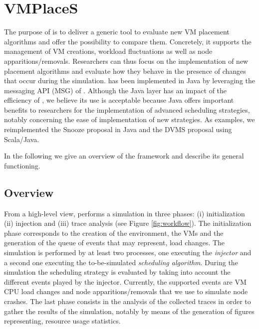 \section{VMPlaceS}
\label{sec:injector}

The purpose of \vmps is to deliver a generic tool to evaluate new VM
placement algorithms and offer the possibility to compare
them. Concretely, it supports the management of VM creations, workload
fluctuations as well as node apparitions/removals.  Researchers can
thus focus on the implementation of new placement algorithms and
evaluate how they behave in the presence of changes that occur during
the simulation.
%
\vmps has been implemented in Java by leveraging the messaging API
(MSG) of \sg. Although the Java layer has an impact of the efficiency
of \sg, we believe its use is acceptable because Java offers important
benefits to researchers for the implementation of advanced scheduling
strategies, notably concerning the ease of implementation of new
strategies. As examples, we reimplemented the Snooze proposal in Java
and the DVMS proposal using Scala/Java.

In the following we give an overview of the framework and describe its
general functioning.%

\subsection{Overview}
\label{sec:overview}

From a high-level view, \vmps performs a simulation in three phases:
(i) initialization (ii) injection and (iii) trace analysis (see Figure
\ref{fig:workflow}).  The initialization phase corresponds to the
creation of the environment, the VMs and the generation of the queue
of events that may represent, \eg load changes.  The
simulation is performed by at least two \sg processes, one executing
the \emph{injector}
and a second one executing the to-be-simulated
\emph{scheduling algorithm}. During the simulation the scheduling
strategy is evaluated by taking into account the different events
played by the injector. Currently, the supported events are VM CPU
load changes and node apparitions/removals that we use to simulate node crashes.
%
The last phase consists in the analysis of the collected traces in
order to gather the results of the simulation, notably by means of the
generation of figures representing, \eg resource usage statistics.

